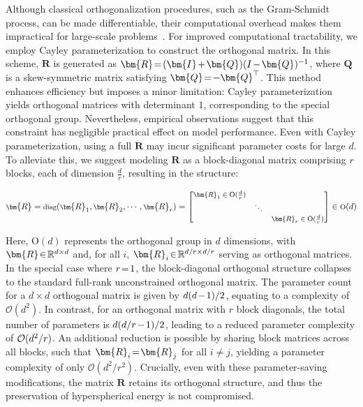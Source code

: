 {Although classical orthogonalization procedures, such as the Gram-Schmidt process, can be made differentiable, their computational overhead makes them impractical for large-scale problems~\cite{liu2021orthogonal}. For improved computational tractability, we employ Cayley parameterization to construct the orthogonal matrix. In this scheme, $\bm{R}$ is generated as $\thickmuskip=2mu \medmuskip=2mu \bm{R}=(\bm{I}+\bm{Q})(I-\bm{Q})^{-1}$, where $\bm{Q}$ is a skew-symmetric matrix satisfying $\thickmuskip=2mu \medmuskip=2mu \bm{Q}=-\bm{Q}^\top$. This method enhances efficiency but imposes a minor limitation: Cayley parameterization yields orthogonal matrices with determinant $1$, corresponding to the special orthogonal group. Nevertheless, empirical observations suggest that this constraint has negligible practical effect on model performance. Even with Cayley parameterization, using a full $\bm{R}$ may incur significant parameter costs for large $d$. To alleviate this, we suggest modeling $\bm{R}$ as a block-diagonal matrix comprising $r$ blocks, each of dimension $\frac{d}{r}$, resulting in the structure:

\begin{equation}
    \footnotesize
    \bm{R}=\text{diag}(\bm{R}_1,\bm{R}_2,\cdots,\bm{R}_r)=\begin{bmatrix}
    \bm{R}_1\in \text{O}(\frac{d}{r}) &  &\\
    &\ddots & \\
    & & \bm{R}_r\in \text{O}(\frac{d}{r})
    \end{bmatrix}\in \text{O}(d)
\end{equation}

Here, $\text{O}(d)$ represents the orthogonal group in $d$ dimensions, with $\thickmuskip=2mu \medmuskip=2mu \bm{R}\in\mathbb{R}^{d\times d}$ and, for all $i$, $\thickmuskip=2mu \medmuskip=2mu \bm{R}_i\in\mathbb{R}^{d/r\times d/r}$ serving as orthogonal matrices. In the special case where $\thickmuskip=2mu \medmuskip=2mu r=1$, the block-diagonal orthogonal structure collapses to the standard full-rank unconstrained orthogonal matrix. The parameter count for a $d\times d$ orthogonal matrix is given by $\thickmuskip=2mu \medmuskip=2mu d(d-1)/2$, equating to a complexity of $\mathcal{O}(d^2)$. In contrast, for an orthogonal matrix with $r$ block diagonals, the total number of parameters is $\thickmuskip=2mu \medmuskip=2mu d(d/r-1)/2$, leading to a reduced parameter complexity of $\thickmuskip=2mu \medmuskip=2mu \mathcal{O}(d^2/r)$. An additional reduction is possible by sharing block matrices across all blocks, such that $\thickmuskip=2mu \medmuskip=2mu\bm{R}_i=\bm{R}_j$ for all $i\neq j$, yielding a parameter complexity of only $\mathcal{O}(d^2/r^2)$. Crucially, even with these parameter-saving modifications, the matrix $\bm{R}$ retains its orthogonal structure, and thus the preservation of hyperspherical energy is not compromised.

}
